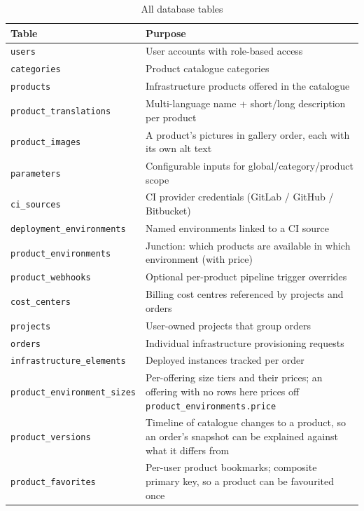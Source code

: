 \documentclass[12pt,a4paper,twoside]{report}
\newcommand{\code}[1]{\texttt{#1}}
\begin{document}
\begin{table}[H]
  \centering
  \caption{All database tables}
  \begin{tabular}{@{}lp{9cm}@{}}
    \toprule
    \textbf{Table} & \textbf{Purpose} \\
    \midrule
    \code{users}                    & User accounts with role-based access \\
    \code{categories}               & Product catalogue categories \\
    \code{products}                 & Infrastructure products offered in the catalogue \\
    \code{product\_translations}    & Multi-language name + short/long description per product \\
    \code{product\_images}          & A product's pictures in gallery order, each with its own alt text \\
    \code{parameters}               & Configurable inputs for global/category/product scope \\
    \code{ci\_sources}              & CI provider credentials (GitLab / GitHub / Bitbucket) \\
    \code{deployment\_environments} & Named environments linked to a CI source \\
    \code{product\_environments}    & Junction: which products are available in which environment (with price) \\
    \code{product\_webhooks}        & Optional per-product pipeline trigger overrides \\
    \code{cost\_centers}            & Billing cost centres referenced by projects and orders \\
    \code{projects}                 & User-owned projects that group orders \\
    \code{orders}                   & Individual infrastructure provisioning requests \\
    \code{infrastructure\_elements} & Deployed instances tracked per order \\
    \code{product\_environment\_sizes} & Per-offering size tiers and their prices; an offering with no rows here prices off \code{product\_environments.price} \\
    \code{product\_versions}        & Timeline of catalogue changes to a product, so an order's snapshot can be explained against what it differs from \\
    \code{product\_favorites}       & Per-user product bookmarks; composite primary key, so a product can be favourited once \\

\end{tabular}
\end{table}
\end{document}
